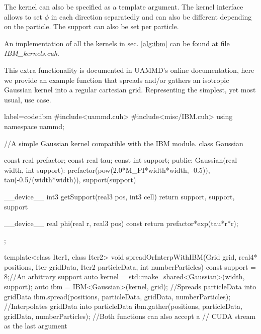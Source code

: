 \documentclass[ twoside,openright,titlepage,numbers=noenddot,%
headinclude,footinclude,cleardoublepage=empty,abstract=on,
BCOR=5mm,paper=a4,fontsize=11pt, dvipsnames
]{scrreprt}
\newcommand{\uammd}{\gls{UAMMD}\xspace}
\begin{document}
The kernel can also be specified as a template argument. The kernel interface allows to set $\phi$ in each direction separatedly and can also be different depending on the particle. The support can also be set per particle.

An implementation of all the kernels in sec. \ref{alg:ibm} can be found at file \emph{IBM\_kernels.cuh}.

This extra functionality is documented in \uammd's online documentation, here we provide an example function that spreads and/or gathers an isotropic Gaussian kernel into a regular cartesian grid. Representing the simplest, yet most usual, use case.

\begin{code2}  {label=code:ibm}
#include<uammd.cuh>
#include<misc/IBM.cuh>
using namespace uammd;

//A simple Gaussian kernel compatible with the IBM module.
class Gaussian{
  const real prefactor;
  const real tau;
  const int support;
public:
  Gaussian(real width, int support):
    prefactor(pow(2.0*M_PI*width*width, -0.5)),
    tau(-0.5/(width*width)),
    support(support){}

  __device__ int3 getSupport(real3 pos, int3 cell){
    return {support, support, support}
  }

  __device__ real phi(real r, real3 pos) const{
    return prefactor*exp(tau*r*r);
  }
};

template<class Iter1, class Iter2>
void spreadOrInterpWithIBM(Grid grid, real4* positions,
                   Iter gridData, Iter2 particleData,
                   int numberParticles){
  const support = 8;//An arbitrary support
  auto kernel = std::make_shared<Gaussian>(width, support);
  auto ibm = IBM<Gaussian>(kernel, grid);
  //Spreads particleData into gridData
  ibm.spread(positions, particleData, 
             gridData, numberParticles);
  //Interpolates gridData into particleData
  ibm.gather(positions, particleData,
             gridData, numberParticles);
  //Both functions can also accept a 
  // CUDA stream as the last argument
}
\end{code2}
\end{document}

